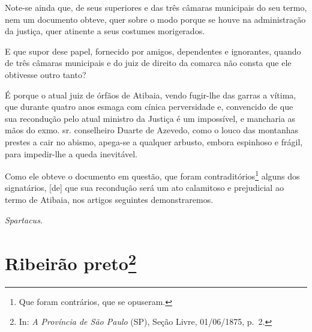 Note-se ainda que, de seus superiores e das três câmaras municipais do
seu termo, nem um documento obteve, quer sobre o modo porque se houve na
administração da justiça, quer atinente a seus costumes morigerados.

E que supor dese papel, fornecido por amigos, dependentes e ignorantes,
quando de três câmaras municipais e do juiz de direito da comarca não
consta que ele obtivesse outro tanto?

É porque o atual juiz de órfãos de Atibaia, vendo fugir-lhe das garras a
vítima, que durante quatro anos esmaga com cínica perversidade e,
convencido de que sua recondução pelo atual ministro da Justiça é um
impossível, e mancharia as mãos do exmo. sr. conselheiro Duarte de
Azevedo, como o louco das montanhas prestes a cair no abismo, apega-se a
qualquer arbusto, embora espinhoso e frágil, para impedir-lhe a queda
inevitável.

Como ele obteve o documento em questão, que foram
contraditórios\footnote{ Que foram contrários, que se opuseram.} alguns
dos signatários, {[}de{]} que sua recondução será um ato calamitoso e
prejudicial ao termo de Atibaia, nos artigos seguintes demonstraremos.

\emph{Spartacus.}

\chapter{Ribeirão preto\footnote{ In: \emph{A Província de São Paulo} (SP), Seção Livre,
  01/06/1875, p.~2.}} %

